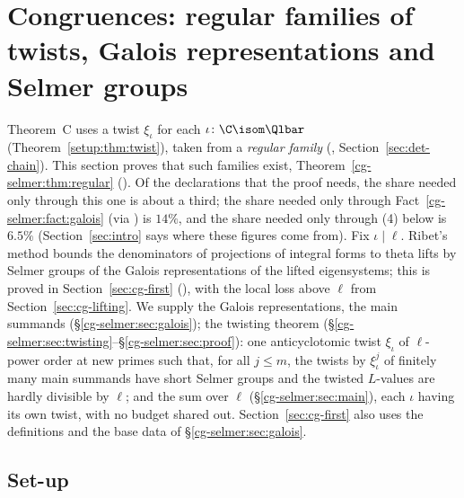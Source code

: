 \section{Congruences: regular families of twists, Galois representations and Selmer groups}
\label{sec:cg-selmer}

Theorem~C uses a twist $\xi_\iota$ for each $\iota\colon\C\isom\Qlbar$
(Theorem~\ref{setup:thm:twist}), taken from a \emph{regular family}
(, Section~\ref{sec:det-chain}). This section proves that such families
exist, Theorem~\ref{cg-selmer:thm:regular} (). Of the declarations
that the proof needs, the share needed only through this one is about a third; the share needed
only through Fact~\ref{cg-selmer:fact:galois} (via ) is
$14\%$, and the share needed only through (4) below is $6.5\%$ (Section~\ref{sec:intro} says where
these figures come from). Fix $\iota\mid\ell$. Ribet's method bounds the denominators of projections
of integral forms to theta lifts by Selmer groups of the Galois representations of the lifted
eigensystems; this is proved in Section~\ref{sec:cg-first}
(), with the local loss above $\ell$ from
Section~\ref{sec:cg-lifting}. We supply the Galois representations, the main summands
(\S\ref{cg-selmer:sec:galois}); the twisting theorem
(\S\ref{cg-selmer:sec:twisting}--\S\ref{cg-selmer:sec:proof}): one anticyclotomic twist $\xi_\iota$ of
$\ell$-power order at new primes such that, for all $j\le m$, the twists by $\xi_\iota^j$ of finitely many
main summands have short Selmer groups and the twisted $L$-values are hardly divisible by $\ell$; and
the sum over $\ell$ (\S\ref{cg-selmer:sec:main}), each $\iota$ having its own twist, with no budget
shared out. Section~\ref{sec:cg-first} also uses the definitions and the base data of
\S\ref{cg-selmer:sec:galois}.

\subsection{Set-up}\label{cg-selmer:sec:setup}

